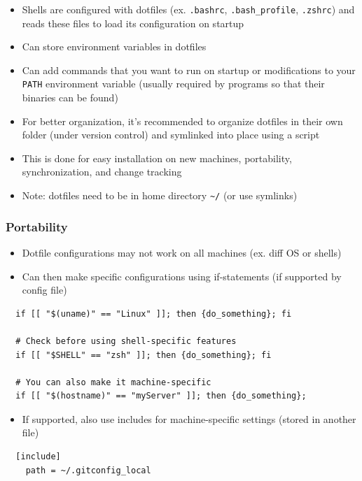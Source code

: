 \documentclass[letterpaper,12pt]{article}
\begin{document}
\begin{itemize}
 \item Shells are configured with dotfiles (ex. \lstinline{.bashrc}, \lstinline{.bash_profile}, \lstinline{.zshrc}) and reads these files to load its configuration on startup
 \item Can store environment variables in dotfiles
 \item Can add commands that you want to run on startup or modifications to your \lstinline{PATH} environment variable (usually required by programs so that their binaries can be found)
 \item For better organization, it's recommended to organize dotfiles in their own folder (under version control) and symlinked into place using a script
 \item This is done for easy installation on new machines, portability, synchronization, and change tracking
 \item Note: dotfiles need to be in home directory \lstinline{~/} (or use symlinks)
\end{itemize}

\subsubsection{Portability}

\begin{itemize}
 \item Dotfile configurations may not work on all machines (ex. diff OS or shells)
 \item Can then make specific configurations using if-statements (if supported by config file)
\end{itemize}

\begin{lstlisting}
  if [[ "$(uname)" == "Linux" ]]; then {do_something}; fi

  # Check before using shell-specific features
  if [[ "$SHELL" == "zsh" ]]; then {do_something}; fi

  # You can also make it machine-specific
  if [[ "$(hostname)" == "myServer" ]]; then {do_something};
\end{lstlisting}

\begin{itemize}
 \item If supported, also use includes for machine-specific settings (stored in another file)
\end{itemize}

\begin{lstlisting}
  [include]
    path = ~/.gitconfig_local
\end{lstlisting}
\end{document}
